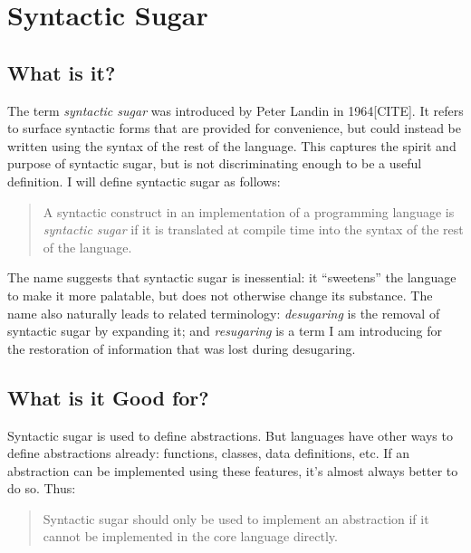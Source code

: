 \chapter{Syntactic Sugar}

\section{What is it?}

The term \emph{syntactic sugar} was introduced by Peter Landin in
1964[CITE]. It refers to surface syntactic forms that are provided for
convenience, but could instead be written using the syntax of the rest
of the language. This captures the spirit and purpose of syntactic
sugar, but is not discriminating enough to be a useful definition.
I will define syntactic sugar as follows:
\begin{quote}
  A syntactic construct in an implementation of a programming language
  is \emph{syntactic sugar} if it is translated at compile time into
  the syntax of the rest of the language.
\end{quote}

The name suggests that syntactic sugar is inessential: it ``sweetens''
the language to make it more palatable, but does not otherwise change
its substance. The name also naturally leads to related terminology:
\emph{desugaring} is the removal of syntactic sugar by expanding it;
and \emph{resugaring} is a term I am introducing for the restoration
of information that was lost during desugaring.

\section{What is it Good for?}

Syntactic sugar is used to define abstractions. But languages have
other ways to define abstractions already: functions, classes, data
definitions, etc. If an abstraction can be implemented using these
features, it's almost always better to do so. Thus:
\begin{quote}
  Syntactic sugar should only be used to implement an abstraction if
  it cannot be implemented in the core language directly.
\end{quote}

